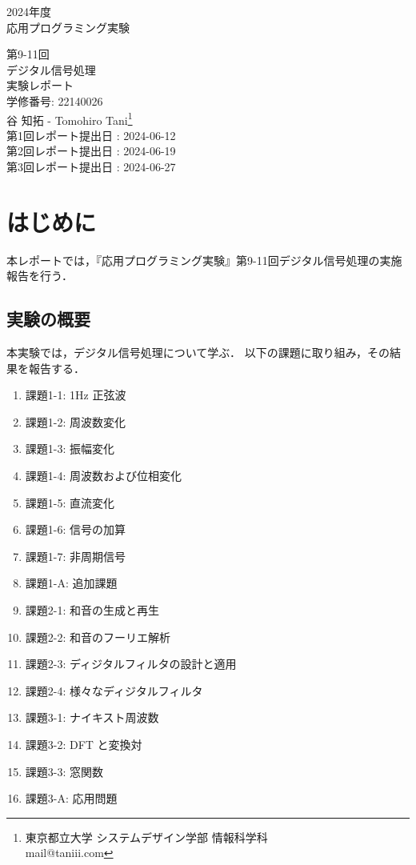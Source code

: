 \documentclass[fleqn, a4paper. 12pt]{jsarticle}
\begin{document}
  \begin{titlepage}
    \begin{center}
      {\Huge 2024年度\\応用プログラミング実験}
      
      \vspace{4cm}
      {\Huge 第9-11回\\デジタル信号処理\\
        実験レポート\\
      }
      \vspace{4cm}
      {\large 学修番号: 22140026\\谷 知拓 - Tomohiro Tani\footnote{東京都立大学 システムデザイン学部 情報科学科 \\ mail@taniii.com} \\}
      \vspace{0.5cm}
      {\large
        第1回レポート提出日 : 2024-06-12 \\
        第2回レポート提出日 : 2024-06-19 \\
        第3回レポート提出日 : 2024-06-27 \\
      }
    \end{center}
  \end{titlepage}

  \section*{はじめに}

    本レポートでは，『応用プログラミング実験』第9-11回デジタル信号処理の実施報告を行う．

  \subsection*{実験の概要}

    本実験では，デジタル信号処理について学ぶ．
    以下の課題に取り組み，その結果を報告する．

    \begin{enumerate}
      \item 課題1-1: 1Hz 正弦波
      \item 課題1-2: 周波数変化
      \item 課題1-3: 振幅変化
      \item 課題1-4: 周波数および位相変化
      \item 課題1-5: 直流変化
      \item 課題1-6: 信号の加算
      \item 課題1-7: 非周期信号
      \item 課題1-A: 追加課題
      \item 課題2-1: 和音の生成と再生
      \item 課題2-2: 和音のフーリエ解析
      \item 課題2-3: ディジタルフィルタの設計と適用
      \item 課題2-4: 様々なディジタルフィルタ
      \item 課題3-1: ナイキスト周波数
      \item 課題3-2: DFT と変換対
      \item 課題3-3: 窓関数
      \item 課題3-A: 応用問題
    \end{enumerate}
\end{document}
